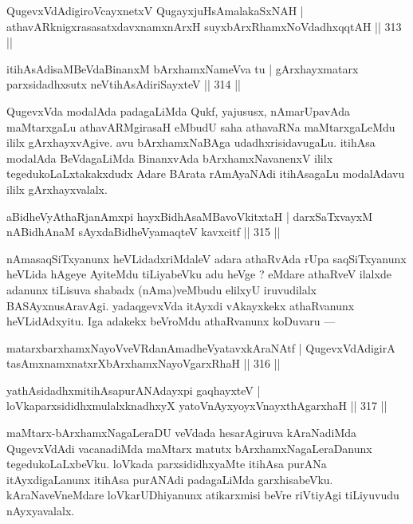 \begin{shl}
QugevxVdAdigiroVcayxnetxV QugayxjuHsAmalakaSxNAH |
athavARknigxrasasatxdavxnamxnArxH suyxbArxRhamxNoVdadhxqqtAH \hfill || 313 ||
\end{shl}

\begin{shl}
itihAsAdisaMBeVdaBinanxM bArxhamxNameVva tu |
gArxhayxmatarx parxsidadhxsutx neVtihAsAdiriSayxteV \hfill || 314 ||
\end{shl}

\begin{artha}
QugevxVda modalAda padagaLiMda Qukf, yajususx, nAmarUpavAda maMtarxgaLu athavARMgirasaH eMbudU saha athavaRNa maMtarxgaLeMdu ililx gArxhayxvAgive. avu bArxhamxNaBAga udadhxrisidavugaLu. itihAsa modalAda BeVdagaLiMda BinanxvAda bArxhamxNavanenxV ililx tegedukoLaLxtakakxdudx Adare BArata rAmAyaNAdi itihAsagaLu modalAdavu ililx gArxhayxvalalx.
\end{artha}


\begin{shl}
aBidheVyAthaRjanAmxpi hayxBidhAsaMBavoVkitxtaH |
darxSaTxvayxM nABidhAnaM sAyxdaBidheVyamaqteV kavxcitf \hfill || 315 ||
\end{shl}

\begin{artha}
nAmasaqSiTxyanunx heVLidadxriMdaleV adara athaRvAda rUpa saqSiTxyanunx heVLida hAgeye AyiteMdu tiLiyabeVku adu heVge ? eMdare athaRveV ilalxde adanunx tiLisuva shabadx (nAma)veMbudu elilxyU iruvudilalx BASAyxnusAravAgi. yadaqgevxVda itAyxdi vAkayxkekx athaRvanunx heVLidAdxyitu. Iga adakekx beVroMdu athaRvanunx koDuvaru  {\rm ---} 
\end{artha}

\begin{shl}
matarxbarxhamxNayoVveVRdanAmadheVyatavxkAraNAtf |
QugevxVdAdigirA tasAmxnamxnatxrXbArxhamxNayoVgarxRhaH \hfill || 316 ||
\end{shl}

\begin{shl}
yathAsidadhxmitihAsapurANAdayxpi gaqhayxteV |
loVkaparxsididhxmulalxknadhxyX yatoV\s nAyxyoyxV\s nayxthAgarxhaH \hfill || 317 ||
\end{shl}

\begin{artha}
maMtarx-bArxhamxNagaLeraDU veVdada hesarAgiruva kAraNadiMda QugevxVdAdi vacanadiMda maMtarx matutx bArxhamxNagaLeraDanunx tegedukoLaLxbeVku. loVkada parxsididhxyaMte itihAsa purANa itAyxdigaLanunx itihAsa purANAdi padagaLiMda garxhisabeVku. kAraNaveVneMdare loVkarUDhiyanunx atikarxmisi beVre riVtiyAgi tiLiyuvudu nAyxyavalalx.
\end{artha}

